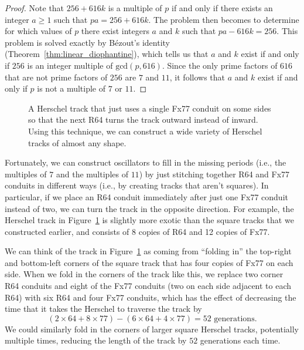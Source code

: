 \begin{proof}
	Note that $256 + 616k$ is a multiple of $p$ if and only if there exists an integer $a \geq 1$ such that $pa = 256 + 616k$. The problem then becomes to determine for which values of $p$ there exist integers $a$ and $k$ such that $pa - 616k = 256$. This problem is solved exactly by B\'ezout's identity (Theorem~\ref{thm:linear_diophantine}), which tells us that $a$ and $k$ exist if and only if $256$ is an integer multiple of $\mathrm{gcd}(p,616)$. Since the only prime factors of $616$ that are not prime factors of $256$ are $7$ and $11$, it follows that $a$ and $k$ exist if and only if $p$ is not a multiple of $7$ or $11$.
\end{proof}

\begin{figure}[!htb]
	\centering
	\caption{A Herschel track that just uses a single Fx77 conduit on some sides so that the next R64 turns the track outward instead of inward. Using this technique, we can construct a wide variety of Herschel tracks of almost any shape.}\label{fig:herschel_track_2}
\end{figure}

Fortunately, we can construct oscillators to fill in the missing periods (i.e., the multiples of $7$ and the multiples of $11$) by just stitching together R64 and Fx77 conduits in different ways (i.e., by creating tracks that aren't squares). In particular, if we place an R64 conduit immediately after just one Fx77 conduit instead of two, we can turn the track in the opposite direction. For example, the Herschel track in Figure~\ref{fig:herschel_track_2} is slightly more exotic than the square tracks that we constructed earlier, and consists of 8 copies of R64 and 12 copies of Fx77.

We can think of the track in Figure~\ref{fig:herschel_track_2} as coming from ``folding in'' the top-right and bottom-left corners of the square track that has four copies of Fx77 on each side. When we fold in the corners of the track like this, we replace two corner R64 conduits and eight of the Fx77 conduits (two on each side adjacent to each R64) with six R64 and four Fx77 conduits, which has the effect of decreasing the time that it takes the Herschel to traverse the track by
\[
(2 \times 64 + 8 \times 77) - (6 \times 64 + 4 \times 77) = 52 \text{ generations.}
\]
We could similarly fold in the corners of larger square Herschel tracks, potentially multiple times, reducing the length of the track by $52$ generations each time.

